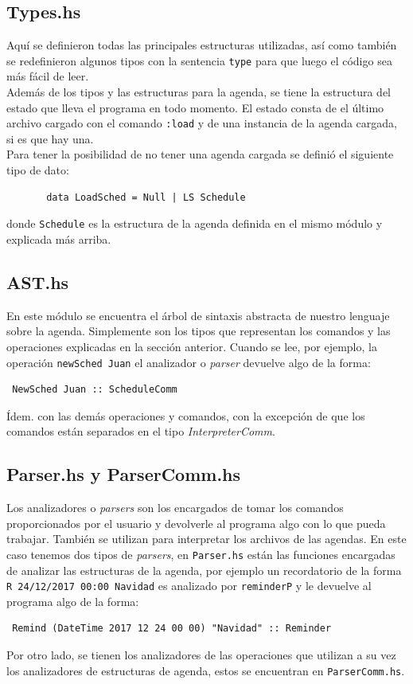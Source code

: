 \documentclass[a4paper,12pt]{article}
\begin{document}
      \subsection*{Types.hs}
       Aquí se definieron todas las principales estructuras utilizadas, así como también se redefinieron algunos tipos con la sentencia \texttt{type} para que luego el código sea más fácil de leer.\\
       Además de los tipos y las estructuras para la agenda, se tiene la estructura del estado que lleva el programa en todo momento. El estado consta de el último archivo cargado con el comando \texttt{:load}
       y de una instancia de la agenda cargada, si es que hay una. \\ 
       Para tener la posibilidad de no tener una agenda cargada se definió el siguiente tipo de dato:
       \begin{verbatim}
       data LoadSched = Null | LS Schedule
       \end{verbatim}
       donde \texttt{Schedule} es la estructura de la agenda definida en el mismo módulo y explicada más arriba.

       \subsection*{AST.hs}
       En este módulo se encuentra el árbol de sintaxis abstracta de nuestro lenguaje sobre la agenda.
       Simplemente son los tipos que representan los comandos y las operaciones explicadas en la sección
       anterior. Cuando se lee, por ejemplo, la operación \texttt{newSched Juan} el analizador o \textit{parser}
       devuelve algo de la forma: \begin{verbatim} NewSched Juan :: ScheduleComm \end{verbatim} Ídem. con las demás operaciones y comandos, con la excepción de que los comandos están separados en el tipo \textit{InterpreterComm}.

       \subsection*{Parser.hs y ParserComm.hs}
       Los analizadores o \textit{parsers} son los encargados de tomar los comandos proporcionados por el usuario y devolverle al programa algo con lo que pueda trabajar. También se utilizan para interpretar los archivos de las agendas. En este caso tenemos dos tipos de \textit{parsers}, en \texttt{Parser.hs} están las funciones encargadas de analizar las estructuras de la agenda, por ejemplo un recordatorio de la forma \texttt{R 24/12/2017 00:00 Navidad} es analizado por \texttt{reminderP} y le devuelve al programa algo de la forma: \begin{verbatim} Remind (DateTime 2017 12 24 00 00) "Navidad" :: Reminder \end{verbatim} Por otro lado, se tienen los analizadores de las operaciones que utilizan a su vez los analizadores de estructuras de agenda, estos se encuentran en \texttt{ParserComm.hs}.
\end{document}
